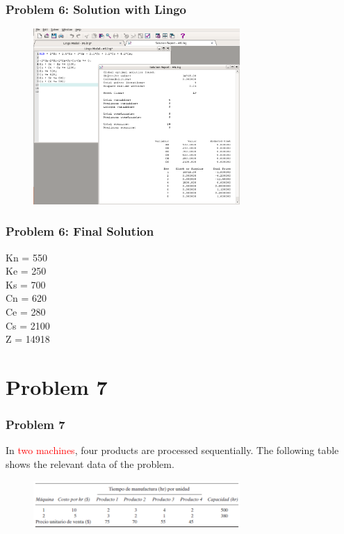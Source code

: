 \documentclass[10pt,svgnames,fragile]{beamer}
\begin{document}
\begin{frame}[label={sec:orge9abdcb}]{}

\frametitle{Problem 6: Solution with Lingo }
\begin{figure}
\includegraphics[width=0.7\textwidth]{images/6.png}
\end{figure}


\end{frame}

\begin{frame}[label={sec:org9c62e72}]{}
\frametitle{Problem 6: Final Solution}

Kn = 550\\
Ke = 250\\
Ks = 700\\
Cn = 620\\
Ce = 280\\
Cs = 2100\\
Z = 14918
\end{frame}


\section{Problem 7}
\label{sec:org92dd686}


\begin{frame}
\frametitle{Problem 7}


In \textcolor{red}{two machines}, four products are processed sequentially. The following table shows the relevant data of the problem.
\begin{figure}
\includegraphics[width=0.7\textwidth]{images/io3.PNG}
\end{figure}\\




\end{frame}
\end{document}
